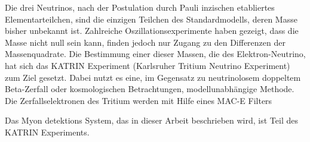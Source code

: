 Die drei Neutrinos, nach der Postulation durch Pauli inzischen etabliertes Elementarteilchen, sind die einzigen Teilchen des Standardmodells, deren Masse bisher unbekannt ist. Zahlreiche Oszillationsexperimente haben gezeigt, dass die Masse nicht null sein kann, finden jedoch nur Zugang zu den Differenzen der Massenquadrate. Die Bestimmung einer dieser Massen, die des Elektron-Neutrino, hat sich das KATRIN Experiment ({Ka}rlsruher {Tri}tium {N}eutrino Experiment) zum Ziel gesetzt. Dabei nutzt es eine, im Gegensatz zu neutrinolosem doppeltem Beta-Zerfall oder kosmologischen Betrachtungen, modellunabh\"angige Methode. Die Zerfallselektronen des Tritium werden mit Hilfe eines MAC-E Filters 

Das Myon detektions System, das in dieser Arbeit beschrieben wird, ist Teil des KATRIN Experiments.